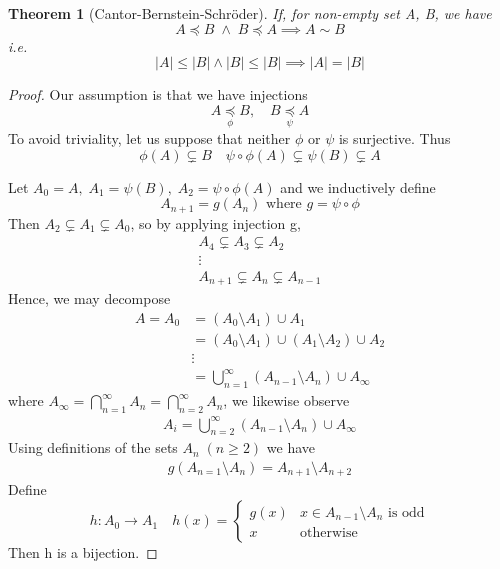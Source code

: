 \documentclass[11pt, oneside]{book}
\theoremstyle{break}
\newtheorem{thm}{Theorem}[section]
\newtheorem*{proof}{Proof}
\begin{document}
\begin{thm}[Cantor-Bernstein-Schröder]
	\label{thm:CBS}
	If, for non-empty set A, B, we have
	\begin{equation}
		A \preceq B \; \land \; B \preceq A \implies A \sim B
	\end{equation}
	i.e.
	\begin{equation}
		|A| \leq |B| \land |B| \leq |B| \implies |A| = |B|
	\end{equation}
\end{thm}

\begin{proof}
	Our assumption is that we have injections
	\begin{equation}
		A \underset{\phi}{\preceq} B, \quad B \underset{\psi}{\preceq} A
	\end{equation}
	To avoid triviality, let us suppose that neither $\phi$ or $\psi$ is surjective. Thus
	\begin{equation}
		\phi(A) \subsetneq B \quad \psi \circ \phi(A) \subsetneq \psi(B) \subsetneq A
	\end{equation}

	Let $A_0 = A, \; A_1 = \psi(B), \; A_2 = \psi \circ \phi(A)$ and we inductively define
	\begin{equation}
		A_{n + 1} = g(A_n) \text{ where } g = \psi \circ \phi
	\end{equation}
	Then $A_2 \subsetneq A_1 \subsetneq A_0$, so by applying injection g,
	\begin{gather*}
		A_4 \subsetneq A_3 \subsetneq A_2 \\
		\vdots \\
		A_{n + 1} \subsetneq A_n \subsetneq A_{n - 1}
	\end{gather*}
	Hence, we may decompose
	\begin{align*}
		A = A_0 &= (A_0 \setminus A_1) \cup A_1 \\
				&= (A_0 \setminus A_1) \cup (A_1 \setminus A_2) \cup A_2 \\
				& \vdots \\
				&= \bigcup_{n = 1}^\infty (A_{n-1} \setminus A_n) \cup A_\infty
	\end{align*}
	where $A_\infty = \bigcap_{n = 1}^\infty A_n = \bigcap_{n = 2}^\infty A_n$, we likewise observe
	\begin{align*}
		A_i = \bigcup_{n = 2}^\infty (A_{n-1} \setminus A_n) \cup A_\infty
	\end{align*}
	Using definitions of the sets $A_n \; (n \geq 2)$ we have
	\begin{align*}
		g(A_{n=1} \setminus A_n) = A_{n+1} \setminus A_{n + 2}
	\end{align*}
	Define
	\begin{equation}
		h : A_0 \to A_1 \quad h(x) = 
		\begin{cases}
			g(x) & x \in A_{n - 1} \setminus A_n \text{ is odd} \\
			x & \text{otherwise}
		\end{cases}
	\end{equation}
	Then h is a bijection.


\end{proof}
\end{document}
